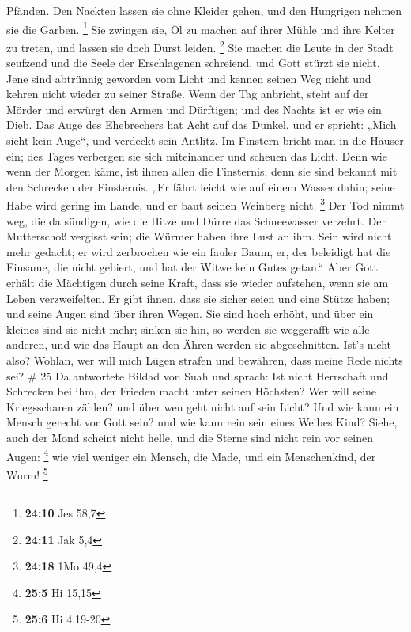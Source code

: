 Pfänden.  Den Nackten lassen sie ohne Kleider gehen, und
den Hungrigen nehmen sie die Garben. \footnote{\textbf{24:10} Jes 58,7}
 Sie zwingen sie, Öl zu machen auf ihrer Mühle und ihre
Kelter zu treten, und lassen sie doch Durst leiden. \footnote{\textbf{24:11}
  Jak 5,4}  Sie machen die Leute in der Stadt seufzend
und die Seele der Erschlagenen schreiend, und Gott stürzt sie nicht.
 Jene sind abtrünnig geworden vom Licht und kennen seinen
Weg nicht und kehren nicht wieder zu seiner Straße.  Wenn
der Tag anbricht, steht auf der Mörder und erwürgt den Armen und
Dürftigen; und des Nachts ist er wie ein Dieb.  Das Auge
des Ehebrechers hat Acht auf das Dunkel, und er spricht: „Mich sieht
kein Auge``, und verdeckt sein Antlitz.  Im Finstern
bricht man in die Häuser ein; des Tages verbergen sie sich miteinander
und scheuen das Licht.  Denn wie wenn der Morgen käme,
ist ihnen allen die Finsternis; denn sie sind bekannt mit den Schrecken
der Finsternis.  „Er fährt leicht wie auf einem Wasser
dahin; seine Habe wird gering im Lande, und er baut seinen Weinberg
nicht. \footnote{\textbf{24:18} 1Mo 49,4}  Der Tod nimmt
weg, die da sündigen, wie die Hitze und Dürre das Schneewasser verzehrt.
 Der Mutterschoß vergisst sein; die Würmer haben ihre
Lust an ihm. Sein wird nicht mehr gedacht; er wird zerbrochen wie ein
fauler Baum,  er, der beleidigt hat die Einsame, die
nicht gebiert, und hat der Witwe kein Gutes getan.`` 
Aber Gott erhält die Mächtigen durch seine Kraft, dass sie wieder
aufstehen, wenn sie am Leben verzweifelten.  Er gibt
ihnen, dass sie sicher seien und eine Stütze haben; und seine Augen sind
über ihren Wegen.  Sie sind hoch erhöht, und über ein
kleines sind sie nicht mehr; sinken sie hin, so werden sie weggerafft
wie alle anderen, und wie das Haupt an den Ähren werden sie
abgeschnitten.  Ist's nicht also? Wohlan, wer will mich
Lügen strafen und bewähren, dass meine Rede nichts sei? \# 25
 Da antwortete Bildad von Suah und sprach: 
Ist nicht Herrschaft und Schrecken bei ihm, der Frieden macht unter
seinen Höchsten?  Wer will seine Kriegsscharen zählen? und
über wen geht nicht auf sein Licht?  Und wie kann ein
Mensch gerecht vor Gott sein? und wie kann rein sein eines Weibes Kind?
 Siehe, auch der Mond scheint nicht helle, und die Sterne
sind nicht rein vor seinen Augen: \footnote{\textbf{25:5} Hi 15,15}
 wie viel weniger ein Mensch, die Made, und ein
Menschenkind, der Wurm! \footnote{\textbf{25:6} Hi 4,19-20}

